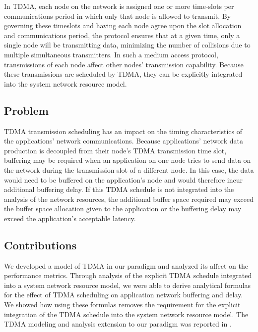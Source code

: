 In TDMA, each node on the network is assigned one or more time-slots per communications period in which only that node is allowed to transmit.  By governing these timeslots and having each node agree upon the slot allocation and communications period, the protocol ensures that at a given time, only a single node will be transmitting data, minimizing the number of collisions due to multiple simultaneous transmitters.  In such a medium access protocol, transmissions of each node affect other nodes' transmission capability.  Because these transmissions are scheduled by TDMA, they can be explicitly integrated into the system network resource model.  

\subsection{Problem}
TDMA transmission scheduling has an impact on the timing characteristics of the applications' network communications.  Because applications' network data production is decoupled from their node's TDMA transmission time slot, buffering may be required when an application on one node tries to send data on the network during the transmission slot of a different node.  In this case, the data would need to be buffered on the application's node and would therefore incur additional buffering delay.  If this TDMA schedule is not integrated into the analysis of the network resources, the additional buffer space required may exceed the buffer space allocation given to the application or the buffering delay may exceed the application's acceptable latency.

\subsection{Contributions}

We developed a model of TDMA in our \shorttool paradigm and analyzed its affect on the performance metrics.  Through analysis of the explicit TDMA schedule integrated into a system network resource model, we were able to derive analytical formulas for the effect of TDMA scheduling on application network buffering and delay.  We showed how using these formulas removes the requirement for the explicit integration of the TDMA schedule into the system network resource model.  The TDMA modeling and analysis extension to our paradigm was reported in \cite{ISIS_F6_ISORC_QOS:15}.

